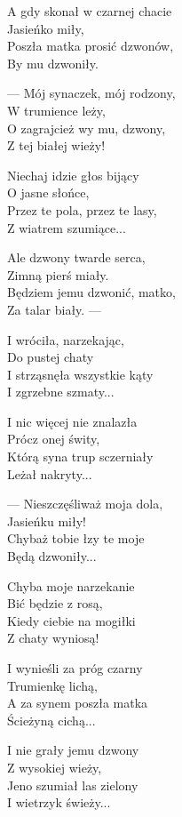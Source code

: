 \begin{text}
    A gdy skonał w czarnej chacie\\
    Jasieńko miły,\\
    Poszła matka prosić dzwonów,\\
    By mu dzwoniły.

    — Mój synaczek, mój rodzony,\\
    W trumience leży,\\
    O zagrajcież wy mu, dzwony,\\
    Z tej białej wieży!

    Niechaj idzie głos bijący\\
    O jasne słońce,\\
    Przez te pola, przez te lasy,\\
    Z wiatrem szumiące...

    Ale dzwony twarde serca,\\
    Zimną pierś miały.\\
    Będziem jemu dzwonić, matko,\\
    Za talar biały. —

    I wróciła, narzekając,\\
    Do pustej chaty\\
    I strząsnęła wszystkie kąty\\
    I zgrzebne szmaty...

    I nic więcej nie znalazła\\
    Prócz onej świty,\\
    Którą syna trup sczerniały\\
    Leżał nakryty...

    — Nieszczęśliważ moja dola,\\
    Jasieńku miły!\\
    Chybaż tobie łzy te moje\\
    Będą dzwoniły...

    Chyba moje narzekanie\\
    Bić będzie z rosą,\\
    Kiedy ciebie na mogiłki\\
    Z chaty wyniosą!

    I wynieśli za próg czarny\\
    Trumienkę lichą,\\
    A za synem poszła matka\\
    Ścieżyną cichą...

    I nie grały jemu dzwony\\
    Z wysokiej wieży,\\
    Jeno szumiał las zielony\\
    I wietrzyk świeży...
\end{text}
\begin{chord}

\end{chord}